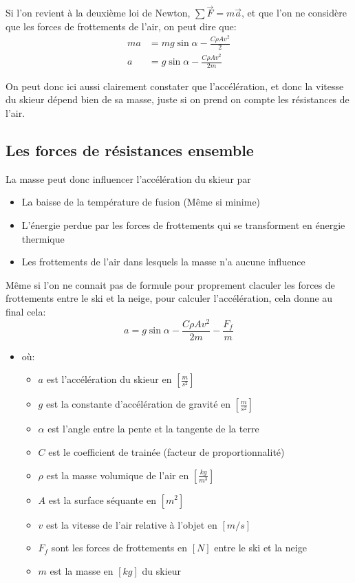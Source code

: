 \documentclass{article}
\begin{document}
\vspace{0.5cm}

Si l'on revient à la deuxième loi de Newton, $\sum{\vec{F}}=m\vec{a}$, et que l'on ne considère que les forces de frottements de l'air, on peut dire que:
\begin{align}    
    \nonumber
    ma &= mg\sin{\alpha} - \frac{C \rho A v^2}{2} \\
    \label{skier_acc_airdrag}
    a &= g\sin{\alpha} - \frac{C \rho A v^2}{2m} 
\end{align}

On peut donc ici aussi clairement constater que l'accélération, et donc la vitesse du skieur dépend bien de sa masse, juste si on prend on compte les résistances de l'air.


\subsection{Les forces de résistances ensemble}

La masse peut donc influencer l'accélération du skieur par 
\begin{itemize}
    \item La baisse de la température de fusion (Même si minime)
    \item L'énergie perdue par les forces de frottements qui se transforment en énergie thermique
    \item Les frottements de l'air dans lesquels la masse n'a aucune influence
\end{itemize}

Même si l'on ne connait pas de formule pour proprement claculer les forces de frottements entre le ski et la neige, pour calculer l'accélération, cela donne au final cela:
\begin{equation}
    \label{acc-global-real}
    a = g\sin{\alpha} - \frac{C \rho A v^2}{2m} - \frac{F_f}{m}
\end{equation}
\begin{itemize}
    \item où:
    \begin{itemize}
        \item $a$ est l'accélération du skieur en $[\frac{m}{s^2}]$
        \item $g$ est la constante d'accélération de gravité en $[\frac{m}{s^2}]$
        \item $\alpha$ est l'angle entre la pente et la tangente de la terre
        \item $C$ est le coefficient de trainée (facteur de proportionnalité)
        \item $\rho$ est la masse volumique de l'air en $[\frac{kg}{m^3}]$
        \item $A$ est la surface séquante en $[m^2]$
        \item $v$ est la vitesse de l'air relative à l'objet en $[m/s]$
        \item $F_f$ sont les forces de frottements en $[N]$ entre le ski et la neige
        \item $m$ est la masse en $[kg]$ du skieur
    \end{itemize}
\end{itemize}
\end{document}
